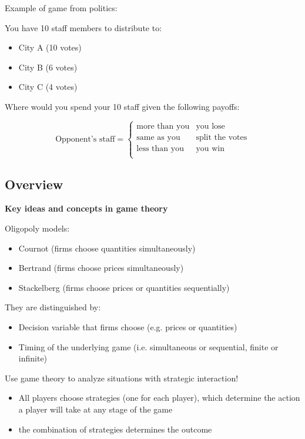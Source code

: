\documentclass[10pt]{article}
\begin{document}
\hfill

Example of game from politics: 

You have 10 staff members to distribute to:
\begin{itemize}
    \item City A (10 votes)
    \item City B (6 votes)
    \item City C (4 votes)
\end{itemize}

\hfill

Where would you spend your 10 staff given the following payoffs: 

\[
\text{Opponent's staff} = 
\begin{cases}
    \text{more than you} & \text{you lose} \\
    \text{same as you} & \text{split the votes} \\
    \text{less than you} & \text{you win} \\
\end{cases}
\]

\hfill

\subsection{Overview}

\textbf{Key ideas and concepts in game theory}

\hfill 

Oligopoly models: 
\begin{itemize}
    \item Cournot (firms choose quantities simultaneously)
    \item Bertrand (firms choose prices simultaneously)
    \item Stackelberg (firms choose prices or quantities sequentially)
\end{itemize}

\hfill 

They are distinguished by:
\begin{itemize}
    \item Decision variable that firms choose (e.g. prices or quantities)
    \item Timing of the underlying game (i.e. simultaneous or sequential, finite or infinite)
\end{itemize}

\newpage

Use game theory to analyze situations with strategic interaction!
\begin{itemize}
    \item All players choose strategies (one for each player), which determine the action a player will take at any stage of the game
    \item the combination of strategies determines the outcome 
\end{itemize}
\end{document}

